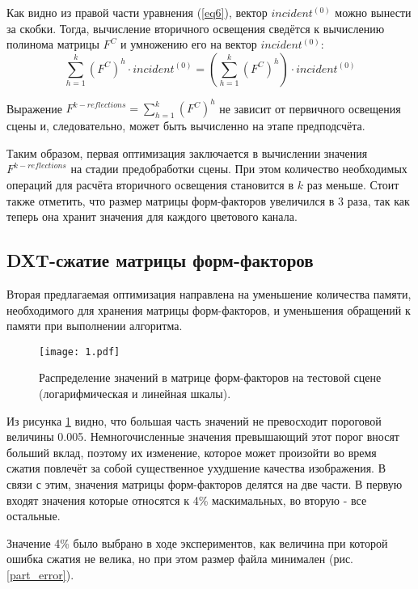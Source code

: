 \documentclass[12pt,fleqn]{article}
\begin{document}
Как видно из правой части уравнения (\ref{eq6}), вектор $incident^{(0)}$ можно вынести за скобки. Тогда, вычисление вторичного освещения сведётся к вычислению полинома матрицы $F^C$ и умножению его на вектор $incident^{(0)}$:
\begin{equation}
\label{eq7}
\sum\limits_{h = 1}^k \left(F^C\right)^h \cdot incident^{(0)} = \left(\sum\limits_{h = 1}^k \left(F^C\right)^h\right) \cdot incident^{(0)}
\end{equation}

Выражение $F^{k-reflections} = \sum\limits_{h = 1}^k \left(F^C\right)^h$ не зависит от первичного освещения сцены и, следовательно, может быть вычисленно на этапе предподсчёта.

Таким образом, первая оптимизация заключается в вычислении значения $F^{k-reflections}$ на стадии предобработки сцены. При этом количество необходимых операций для расчёта вторичного освещения становится в $k$ раз меньше. Стоит также отметить, что размер матрицы форм-факторов увеличился в 3 раза, так как теперь она хранит значения для каждого цветового канала.

\subsection{DXT-сжатие матрицы форм-факторов}

Вторая предлагаемая оптимизация направлена на уменьшение количества памяти, необходимого для хранения матрицы форм-факторов, и уменьшения обращений к памяти при выполнении алгоритма.
\begin{figure}[htb]
    \centering
    \texttt{[image: 1.pdf]}
    \caption{Распределение значений в матрице форм-факторов на тестовой сцене (логарифмическая и линейная шкалы).}
    \label{init_distribution}
\end{figure}

Из рисунка \ref{init_distribution} видно, что большая часть значений не превосходит пороговой величины 0.005. Немногочисленные значения превышающий этот порог вносят больший вклад, поэтому их изменение, которое может произойти во время сжатия повлечёт за собой существенное ухудшение качества изображения. В связи с этим, значения матрицы форм-факторов делятся на две части. В первую входят значения которые относятся к 4\% маскимальных, во вторую - все остальные.

Значение 4\% было выбрано в ходе экспериментов, как величина при которой ошибка сжатия не велика, но при этом размер файла минимален (рис. \ref{part_error}).
\end{document}
